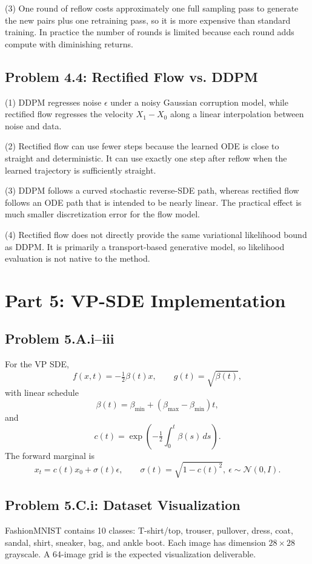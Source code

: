 \documentclass[11pt]{article}
\begin{document}
(3) One round of reflow costs approximately one full sampling pass to generate the new pairs plus one retraining pass, so it is more expensive than standard training. In practice the number of rounds is limited because each round adds compute with diminishing returns.

\subsection*{Problem 4.4: Rectified Flow vs. DDPM}
(1) DDPM regresses noise $\epsilon$ under a noisy Gaussian corruption model, while rectified flow regresses the velocity $X_1-X_0$ along a linear interpolation between noise and data.

(2) Rectified flow can use fewer steps because the learned ODE is close to straight and deterministic. It can use exactly one step after reflow when the learned trajectory is sufficiently straight.

(3) DDPM follows a curved stochastic reverse-SDE path, whereas rectified flow follows an ODE path that is intended to be nearly linear. The practical effect is much smaller discretization error for the flow model.

(4) Rectified flow does not directly provide the same variational likelihood bound as DDPM. It is primarily a transport-based generative model, so likelihood evaluation is not native to the method.

\section{Part 5: VP-SDE Implementation}
\subsection*{Problem 5.A.i--iii}
For the VP SDE,
\[
f(x,t)=-\tfrac12\beta(t)x,\qquad g(t)=\sqrt{\beta(t)},
\]
with linear schedule
\[
\beta(t)=\beta_{\min}+(\beta_{\max}-\beta_{\min})t,
\]
and
\[
c(t)=\exp\!\left(-\tfrac12\int_0^t \beta(s)\,ds\right).
\]
The forward marginal is
\[
x_t=c(t)x_0+\sigma(t)\epsilon,\qquad \sigma(t)=\sqrt{1-c(t)^2},\ \epsilon\sim\mathcal N(0,I).
\]

\subsection*{Problem 5.C.i: Dataset Visualization}
FashionMNIST contains 10 classes: T-shirt/top, trouser, pullover, dress, coat, sandal, shirt, sneaker, bag, and ankle boot. Each image has dimension $28\times 28$ grayscale. A 64-image grid is the expected visualization deliverable.
\end{document}
